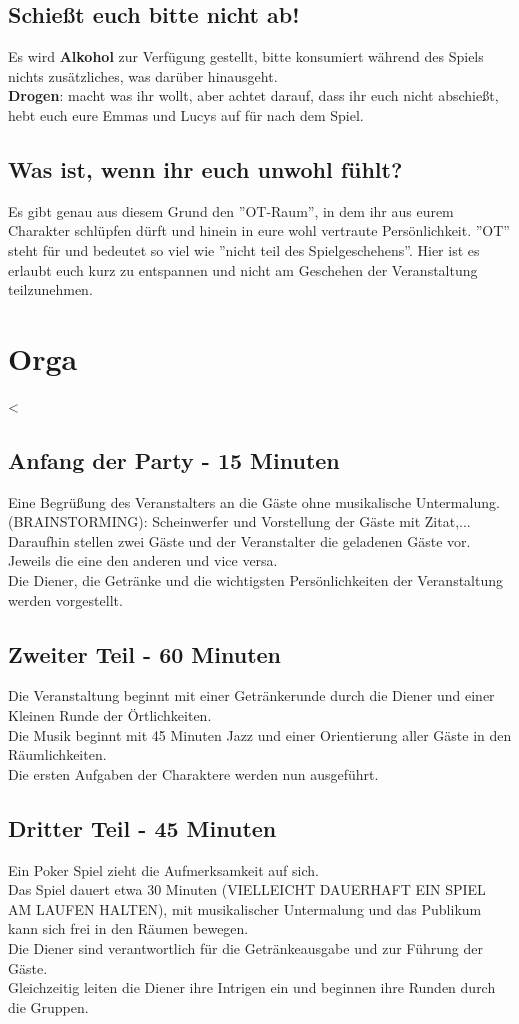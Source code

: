 \documentclass[12pt, a4paper, openany]{report}
\begin{document}
\section{Schießt euch bitte nicht ab!}
Es wird {\bfseries Alkohol} zur Verfügung gestellt, bitte konsumiert während des Spiels nichts zusätzliches, was darüber hinausgeht.\\
{\bfseries Drogen}: macht was ihr wollt, aber achtet darauf, dass ihr euch nicht abschießt, hebt euch eure Emmas und Lucys auf für nach dem Spiel.

\section{Was ist, wenn ihr euch unwohl fühlt?}
Es gibt genau aus diesem Grund den ''OT-Raum'', in dem ihr aus eurem Charakter schlüpfen dürft und hinein in eure wohl vertraute Persönlichkeit. ''OT'' steht für  und bedeutet so viel wie ''nicht teil des Spielgeschehens''. Hier ist es erlaubt euch kurz zu entspannen und nicht am Geschehen der Veranstaltung teilzunehmen. 

\chapter{Orga}<
\section{Anfang der Party - 15 Minuten}
Eine Begrüßung des Veranstalters an die Gäste ohne musikalische Untermalung.\\
(BRAINSTORMING): Scheinwerfer und Vorstellung der Gäste mit Zitat,... \\
Daraufhin stellen zwei Gäste und der Veranstalter die geladenen Gäste vor. Jeweils die eine den anderen und vice versa.\\
Die Diener, die Getränke und die wichtigsten Persönlichkeiten der Veranstaltung werden vorgestellt.
\section{Zweiter Teil - 60 Minuten}
Die Veranstaltung beginnt mit einer Getränkerunde durch die Diener und einer Kleinen Runde der Örtlichkeiten.\\
Die Musik beginnt mit 45 Minuten Jazz und einer Orientierung aller Gäste in den Räumlichkeiten.\\
Die ersten Aufgaben der Charaktere werden nun ausgeführt.
\section{Dritter Teil - 45 Minuten}
Ein Poker Spiel zieht die Aufmerksamkeit auf sich. \\
Das Spiel dauert etwa 30 Minuten (VIELLEICHT DAUERHAFT EIN SPIEL AM LAUFEN HALTEN), mit musikalischer Untermalung und das Publikum kann sich frei in den Räumen bewegen.\\
Die Diener sind verantwortlich für die Getränkeausgabe und zur Führung der Gäste.\\
Gleichzeitig leiten die Diener ihre Intrigen ein und beginnen ihre Runden durch die Gruppen.
\end{document}
